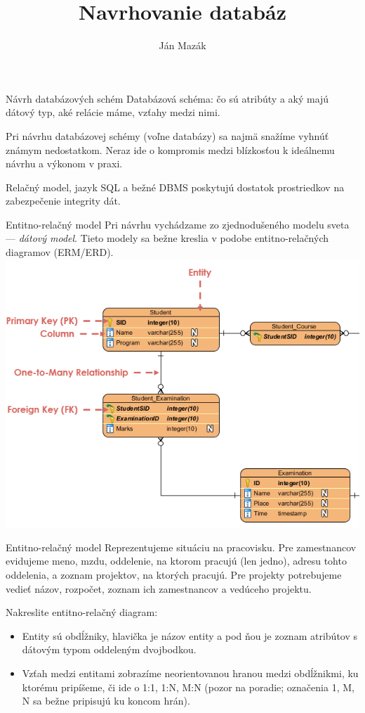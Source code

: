 \documentclass[12pt]{beamer}
\title{Navrhovanie databáz}
\author{Ján Mazák}
\institute{FMFI UK Bratislava}
\date{}
\begin{document}
\frame{\titlepage}

\begin{frame}[fragile]{Návrh databázových schém}
\alert{Databázová schéma}: čo sú atribúty a aký majú dátový typ, aké relácie máme, vzťahy medzi nimi.
\bigskip

Pri návrhu databázovej schémy (voľne databázy) sa najmä snažíme vyhnúť známym nedostatkom.
Neraz ide o kompromis medzi blízkosťou k ideálnemu návrhu a výkonom v praxi.
\bigskip

Relačný model, jazyk SQL a bežné DBMS poskytujú dostatok prostriedkov na zabezpečenie integrity dát.
\end{frame}

\begin{frame}[fragile]{Entitno-relačný model}
Pri návrhu vychádzame zo zjednodušeného modelu sveta --- \emph{dátový model}.
Tieto modely sa bežne kreslia v podobe \alert{entitno-relačných diagramov} (ERM/ERD).
\includegraphics[scale=.5]{erd.png}
\end{frame}

\begin{frame}[fragile]{Entitno-relačný model}
Reprezentujeme situáciu na pracovisku. Pre zamestnancov evidujeme meno, mzdu, 
oddelenie, na ktorom pracujú (len jedno), adresu tohto oddelenia, a zoznam projektov, na ktorých pracujú.
Pre projekty potrebujeme vedieť názov, rozpočet, zoznam ich zamestnancov a vedúceho projektu.

Nakreslite entitno-relačný diagram:
\begin{itemize}
\item Entity sú obdĺžniky, hlavička je názov entity a pod ňou je zoznam atribútov s dátovým typom oddeleným dvojbodkou.
\item Vzťah medzi entitami zobrazíme neorientovanou hranou medzi obdĺžnikmi, ku ktorému pripíšeme, či ide o 1:1, 1:N, M:N
(pozor na poradie; označenia 1, M, N sa bežne pripisujú ku koncom hrán).
\end{itemize}
\end{frame}
\end{document}
